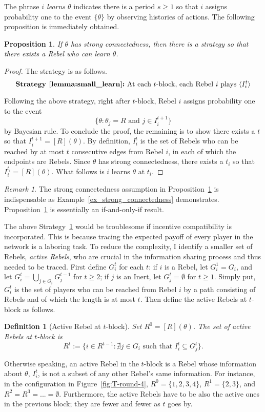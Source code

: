 \documentclass[12pt,letter]{article}
\newtheorem{proposition}{Proposition}[section]
\newtheorem{definition}{Definition}[section]
\theoremstyle{definition}
\theoremstyle{remark}
\newtheorem*{remark}{Remark}
\theoremstyle{claim}
\begin{document}
The phrase \textit{$i$ learns $\theta$} indicates there is a period $s\geq 1$ so that $i$ assigns probability one to the event $\{\theta\}$ by observing histories of actions. The following proposition is immediately obtained. 
\begin{proposition}
\label{lemma:small_learn}
If $\theta$ has strong connectedness, then there is a strategy so that there exists a Rebel who can learn $\theta$.
\end{proposition}
\begin{proof} The strategy is as follows.
\[\textbf{Strategy~\ref{lemma:small_learn}:}\text{ At each $t$-block, each Rebel $i$ plays $\langle {I^t_i} \rangle$}\]

Following the above strategy, right after $t$-block, Rebel $i$ assigns probability one to the event \[\{\theta: \text{$\theta_j=R$ and $j\in I^{t+1}_i$}\}\] by Bayesian rule. To conclude the proof, the remaining is to show there exists a $t$ so that $I^{t+1}_i=[R](\theta)$. By definition, $I^t_i$ is the set of Rebels who can be reached by at most $t$ consecutive edges from Rebel $i$, in each of which the endpoints are Rebels. Since $\theta$ has strong connectedness, there exists a $t_i$ so that $I^{t_i}_i=[R](\theta)$. What follows is $i$ learns $\theta$ at $t_i$.
\end{proof}

\begin{remark}
The strong connectedness assumption in Proposition~\ref{lemma:small_learn} is indispensable as Example~\ref{ex_strong_connectedness} demonstrates. Proposition~\ref{lemma:small_learn} is essentially an if-and-only-if result.
\end{remark}

The above Strategy~\ref{lemma:small_learn} would be troublesome if incentive compatibility is incorporated. This is because tracing the expected payoff of every player in the network is a laboring task. To reduce the complexity, I identify a smaller set of Rebels, \textit{active Rebels}, who are crucial in the information sharing process and thus needed to be traced. First define $G^t_i$ for each $t$: if $i$ is a Rebel, let $G^1_i= G_i$, and let $G^t_i= \bigcup_{j\in G_i} G^{t-1}_j$ for $t\geq 2$; if $j$ is an Inert, let $G^t_j=\emptyset$ for $t\geq 1$. Simply put, $G^t_i$ is the set of players who can be reached from Rebel $i$ by a path consisting of Rebels and of which the length is at most $t$. Then define the active Rebels at $t$-block as follows.
\begin{definition}[Active Rebel at $t$-block]
Set $R^0=[R](\theta)$. The set of active Rebels at $t$-block is 
\[\text{$R^t:= \{i\in R^{t-1}: \nexists j\in G_i \text{ such that }I^t_i\subseteq G^t_j\}$}.\]

\end{definition}
Otherwise speaking, an active Rebel in the $t$-block is a Rebel whose information about $\theta$, $I^t_i$, is not a subset of any other Rebel's same information. For instance, in the configuration in Figure~\ref{fig:T-round-4}, $R^0=\{1,2,3,4\}$, $R^1=\{2,3\}$, and $R^2=R^3=...=\emptyset$. Furthermore, the active Rebels have to be also the active ones in the previous block; they are fewer and fewer as $t$ goes by. 
\end{document}
